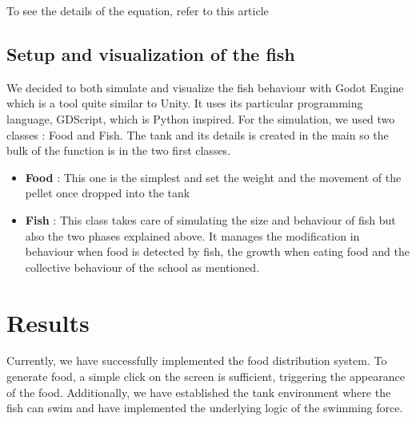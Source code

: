 \documentclass[9pt]{pnas-new}
\begin{document}
To see the details of the equation, refer to this article \cite{article}

\subsection{Setup and visualization of the fish}
We decided to both simulate and visualize the fish behaviour with Godot Engine which is a tool quite similar to Unity. It uses its particular programming language, GDScript, which is Python inspired. For the simulation, we used two classes : Food and Fish. The tank and its details is created in the main so the bulk of the function is in the two first classes.
\begin{itemize}
    \item \textbf{Food} : This one is the simplest and set the weight and the movement of the pellet once dropped into the tank
    \item \textbf{Fish} :  This class takes care of simulating the size and behaviour of fish but also the two phases explained above. It manages the modification in behaviour when food is detected by fish, the growth when eating food and the collective behaviour of the school as mentioned.
\end{itemize}   

\section{Results}

Currently, we have successfully implemented the food distribution system. To generate food, a simple click on the screen is sufficient, triggering the appearance of the food. Additionally, we have established the tank environment where the fish can swim and have implemented the underlying logic of the swimming force.
\end{document}
